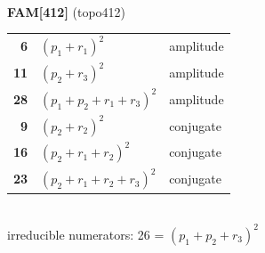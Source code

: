 \documentclass[10pt]{article}
\begin{document}
\begin{minipage}[t]{0.48\textwidth}
{}\\[2mm]\textbf{FAM[412]} (topo412)\\[2pt]{\footnotesize\begin{tabular}{@{}r@{\ \ }l@{\ \ }l@{}}\textbf{6} & $(p_1+r_1)^2$ & amplitude\\
\textbf{11} & $(p_2+r_3)^2$ & amplitude\\
\textbf{28} & $(p_1+p_2+r_1+r_3)^2$ & amplitude\\
\textbf{9} & $(p_2+r_2)^2$ & conjugate\\
\textbf{16} & $(p_2+r_1+r_2)^2$ & conjugate\\
\textbf{23} & $(p_2+r_1+r_2+r_3)^2$ & conjugate\\\end{tabular}}\\[2pt]{\scriptsize irreducible numerators: 26 = $(p_1+p_2+r_3)^2$}\end{minipage}\hfill%
\end{document}
